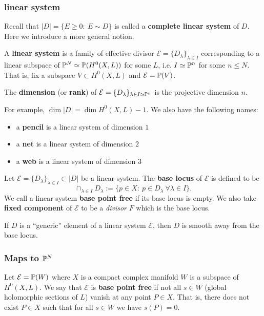 \subsubsection{linear system}

Recall that $|D|=\{E\geq 0:\ E\sim D\}$ is called a \textbf{complete linear system} of $D$. Here we introduce a more general notion.

\begin{definition}
A \textbf{linear system} is a family of effective divisor $\mathcal{E}=\{D_\lambda\}_{\lambda\in I}$ corresponding to a linear subspace of ${\mathbb P}^N\simeq {\mathbb P}(H^0(X,L))$ for some $L$, i.e. $I\simeq {\mathbb P}^n$ for some $n\leq N$. That is, fix a subspace $V\subset H^0(X,L)$ and $\mathcal{E}={\mathbb P}(V)$.
\end{definition}

\begin{definition}
The \textbf{dimension} (or \textbf{rank}) of $\mathcal{E}=\{D_\lambda\}_{\lambda\in I\simeq {\mathbb P}^n}$ is the projective dimension $n$.
\end{definition}

For example, $\dim|D|=\dim H^0(X,L)-1$. We also have the following names:
\begin{itemize}
\item a \textbf{pencil} is a linear system of dimension $1$
\item a \textbf{net} is a linear system of dimension $2$
\item a \textbf{web} is a linear system of dimension $3$
\end{itemize}

\begin{definition}
Let $\mathcal{E}=\{D_\lambda\}_{\lambda\in I}\subset |D|$ be a linear system. The \textbf{base locus} of $\mathcal{E}$ is defined to be
$$\cap_{\lambda\in I} D_\lambda :=\{p \in X:\ p \in D_\lambda\ \forall \lambda\in I\}.$$ We call a linear system \textbf{base point free} if its base locus is empty.
We also take \textbf{fixed component} of $\mathcal{E}$ to be a {\em divisor} $F$ which is the base locus. 
\end{definition}

\begin{theorem}[Bertini]
If $D$ is a ``generic'' element of a linear system $\mathcal{E}$, then $D$ is smooth away from the base locus.
\end{theorem}

\subsubsection{Maps to ${\mathbb P}^N$}
\begin{definition}
Let $\mathcal{E}={\mathbb P}(W)$ where $X$ is a compact complex manifold $W$ is a subspace of $H^0(X,L)$. We say that $\mathcal{E}$ is \textbf{base point free} if not all $s\in W$ (global holomorphic sections of $L$) vanish at any point $P\in X$. That is, there does not exist $P\in X$ such that for all $s\in W$ we have $s(P)=0$. 
\end{definition}

